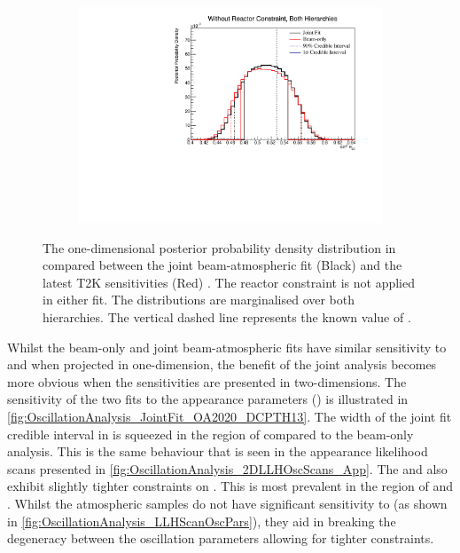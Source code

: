 \begin{figure}[h]
  \begin{subfigure}[t]{0.98\textwidth}
    \includegraphics[width=\textwidth, trim={0mm 0mm 0mm 0mm}, clip,page=1]{Figures/OA/JointFit_OA2020_Comp/ContourComparison_1D_th23_BH_2_woRC_UnSmeared_CredibleInterval.pdf}
  \end{subfigure}
  \caption{The one-dimensional posterior probability density distribution in  compared between the joint beam-atmospheric fit (Black) and the latest T2K sensitivities (Red) \cite{Dunne2020-uf, t2k_tn_393}. The reactor constraint is not applied in either fit. The distributions are marginalised over both hierarchies. The vertical dashed line represents the known value of .}
  \label{fig:OscillationAnalysis_JointFit_OA2020_TH23}
\end{figure}

Whilst the beam-only and joint beam-atmospheric fits have similar sensitivity to  and  when projected in one-dimension, the benefit of the joint analysis becomes more obvious when the sensitivities are presented in two-dimensions. The sensitivity of the two fits to the appearance parameters () is illustrated in \autoref{fig:OscillationAnalysis_JointFit_OA2020_DCPTH13}. The width of the  joint fit credible interval in  is squeezed in the region of  compared to the beam-only analysis. This is the same behaviour that is seen in the appearance likelihood scans presented in \autoref{fig:OscillationAnalysis_2DLLHOscScans_App}. The \quickmath{1\sigma} and  also exhibit slightly tighter constraints on . This is most prevalent in the region of  and . Whilst the atmospheric samples do not have significant sensitivity to  (as shown in \autoref{fig:OscillationAnalysis_LLHScanOscPars}), they aid in breaking the degeneracy between the oscillation parameters allowing for tighter constraints.


